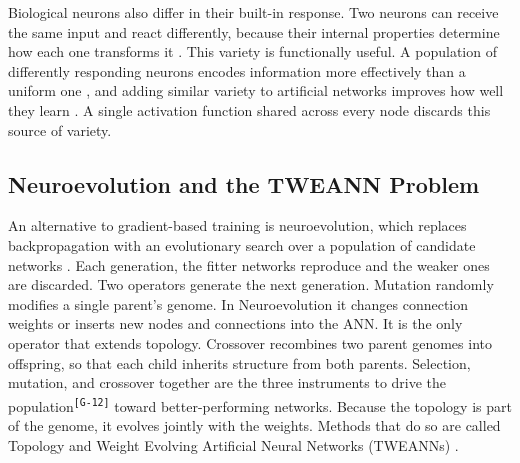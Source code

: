 \documentclass[12pt]{article}
\newcommand{\revID}[1]{\textsuperscript{\scriptsize\texttt{[#1]}}}
\newcommand{\revGram}[2]{\textcolor{lrRed}{#2}\revID{#1}}       %
\begin{document}
Biological neurons also differ in their built-in response.
Two neurons can receive the same input and react differently, because their internal properties determine how each one transforms it \parencite{drion_ion_2015}.
This variety is functionally useful.
A population of differently responding neurons encodes information more effectively than a uniform one \parencite{tripathy_intermediate_2013}, and adding similar variety to artificial networks improves how well they learn \parencite{perez-nieves_neural_2021}.
A single activation function shared across every node discards this source of variety.



\subsection{Neuroevolution and the TWEANN Problem}
\label{subsec:neuroevolution}


An alternative to gradient-based training is neuroevolution, which replaces backpropagation with an evolutionary search over a population of candidate networks \parencite{stanley_designing_2019}.
Each generation, the fitter networks reproduce and the weaker ones are discarded.
Two operators generate the next generation.
Mutation randomly modifies a single parent's genome. In Neuroevolution it changes connection weights or inserts new nodes and connections into the ANN. It is the only operator that extends topology.
Crossover recombines two parent genomes into offspring, so that each child inherits structure from both parents.
Selection, mutation, and crossover together are \revGram{G-12}{the three instruments to drive the population} toward better-performing networks.
Because the topology is part of the genome, it evolves jointly with the weights. Methods that do so are called Topology and Weight Evolving Artificial Neural Networks (TWEANNs) \parencite{stanley_evolving_2002}.
\end{document}
